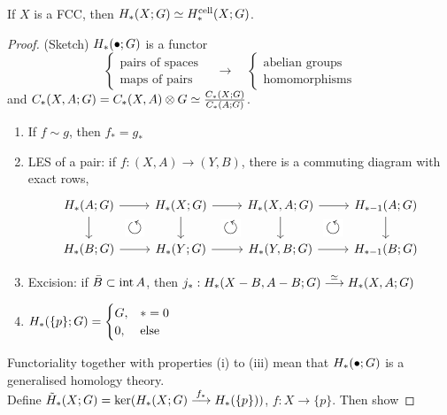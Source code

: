 \documentclass[a4paper,11pt]{article}
\begin{document}
				\begin{thm}
					If $X$ is a FCC, then $H_{\ast}(X;G)\simeq H_\ast^\text{cell}(X;G)$.
				\end{thm}
				\begin{proof}(Sketch)
					$H_{\ast}(\bullet;G)$ is a functor
					\begin{equation*}
						\begin{cases}
							\text{pairs of spaces}\\\text{maps of pairs}
						\end{cases}\quad\longrightarrow\quad \begin{cases}
							\text{abelian groups}\\ \text{homomorphisms}
						\end{cases}
					\end{equation*} 
					and $C_{\ast}(X,A;G)=C_{\ast}(X,A)\otimes G\simeq\frac{C_{\ast}(X;G)}{C_{\ast}(A;G)}$.
					\begin{enumerate}
						\item If $f\sim g$, then $f_\ast=g_\ast$
						\item LES of a pair: if $f:(X,A)\rightarrow (Y,B)$, there is a commuting diagram with exact rows,
							\begin{equation*}
								\begin{tikzcd}
									\hg{A;G}\ar[d]\ar[r]& \hg{X;G}\ar[d]\ar[r]& \hg{X,A;G}\ar[d]\ar[r]& \hg[\ast-1]{A;G}\ar[d]\\
									\hg{B;G}\arrow[ur, phantom, "\scalebox{1.5}{$\circlearrowleft$}" description]\ar[r]& \hg{Y;G}\arrow[ur, phantom, "\scalebox{1.5}{$\circlearrowleft$}" description]\ar[r]& \hg{Y,B;G}\arrow[ur, phantom, "\scalebox{1.5}{$\circlearrowleft$}" description]\ar[r]& \hg[\ast-1]{B;G}
								\end{tikzcd}
							\end{equation*}
						\item Excision: if $\bar{B}\subset\operatorname{int} A$, then $j_\ast:H_{\ast}(X-B,A-B;G)\overset{\simeq}{\longrightarrow}H_{\ast}(X,A;G)$
						\item $H_{\ast}(\{p\};G)=\begin{cases}
							G,&\ast=0\\0,& \text{else}
						\end{cases}$
					\end{enumerate}
					Functoriality together with properties (i) to (iii) mean that $H_{\ast}(\bullet;G)$ is a generalised homology theory.\\
					Define $\tilde{H}_{\ast}(X;G)=\ker(H_{\ast}(X;G)\overset{f_\ast}{\longrightarrow}H_{\ast}(\{p\}))$, $f:X\rightarrow\{p\}$. Then show

\end{proof}
\end{document}
